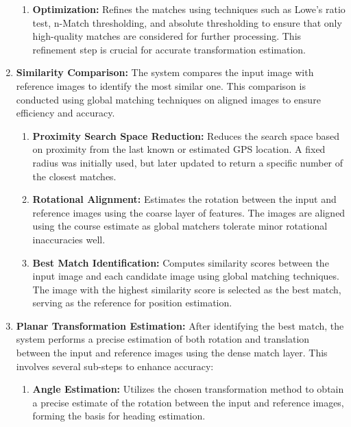 \begin{enumerate}
\begin{enumerate}
        \item \textbf{Optimization:}  
        Refines the matches using techniques such as Lowe's ratio test, n-Match thresholding, and absolute thresholding to ensure that only high-quality matches are considered for further processing. This refinement step is crucial for accurate transformation estimation. 
    \end{enumerate}
    \item \textbf{Similarity Comparison:}  
    The system compares the input image with reference images to identify the most similar one. This comparison is conducted using global matching techniques on aligned images to ensure efficiency and accuracy.
    \begin{enumerate}
        \item \textbf{Proximity Search Space Reduction:}  
        Reduces the search space based on proximity from the last known or estimated GPS location. A fixed radius was initially used, but later updated to return a specific number of the closest matches. 
        
        \item \textbf{Rotational Alignment:}  
        Estimates the rotation between the input and reference images using the coarse layer of features. The images are aligned using the course estimate as global matchers tolerate minor rotational inaccuracies well.
        
        \item \textbf{Best Match Identification:}  
        Computes similarity scores between the input image and each candidate image using global matching techniques. The image with the highest similarity score is selected as the best match, serving as the reference for position estimation.
    \end{enumerate}



    \item \textbf{Planar Transformation Estimation:}  
    After identifying the best match, the system performs a precise estimation of both rotation and translation between the input and reference images using the dense match layer. This involves several sub-steps to enhance accuracy:
    \begin{enumerate}
        \item \textbf{Angle Estimation:}  
        Utilizes the chosen transformation method to obtain a precise estimate of the rotation between the input and reference images, forming the basis for heading estimation.
        

\end{enumerate}
\end{enumerate}
